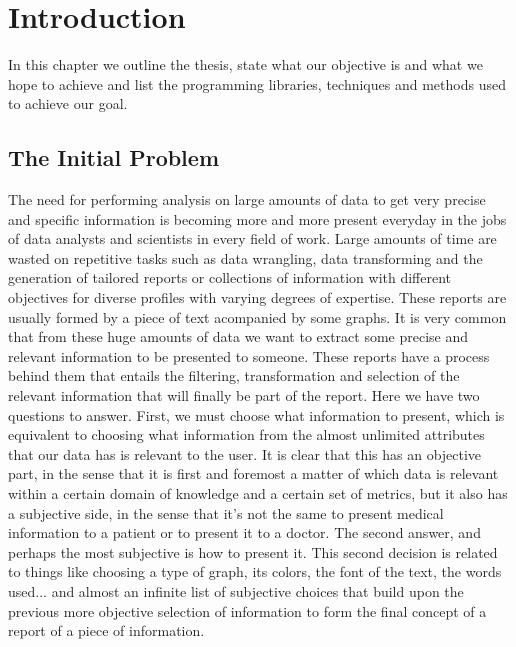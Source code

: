 %
%

\chapter{Introduction}

\begin{resumen}
In this chapter we outline the thesis, state what our objective is and what we hope to achieve and list the programming libraries, techniques and methods used to achieve our goal.
\end{resumen}

\section{The Initial Problem}
\label{cap1:sec:problem}

The need for performing analysis on large amounts of data to get very precise and specific information is becoming more and more present everyday in the jobs of data analysts and scientists in every field of work.
Large amounts of time are wasted on repetitive tasks such as data wrangling, data transforming and the generation of tailored reports or collections of information with different objectives for diverse profiles with varying degrees of expertise.
These reports are usually formed by a piece of text acompanied by some graphs.
It is very common that from these huge amounts of data we want to extract some precise and relevant information to be presented to someone.
These reports have a process behind them that entails the filtering, transformation and selection of the relevant information that will finally be part of the report.
Here we have two questions to answer. First, we must choose what information to present, which is equivalent to choosing what information from the almost unlimited attributes that our data has is relevant to the user. 
It is clear that this has an objective part, in the sense that it is first and foremost a matter of which data is relevant within a certain domain of knowledge and a certain set of metrics, but it also has a subjective side, in the sense that it's not the same to present medical information to a patient or to present it to a doctor. 
The second answer, and perhaps the most subjective is how to present it. This second decision is related to things like choosing a type of graph, its colors, the font of the text, the words used... and almost an infinite list of subjective choices that build upon the previous more objective selection of information to form the final concept of a report of a piece of information.

